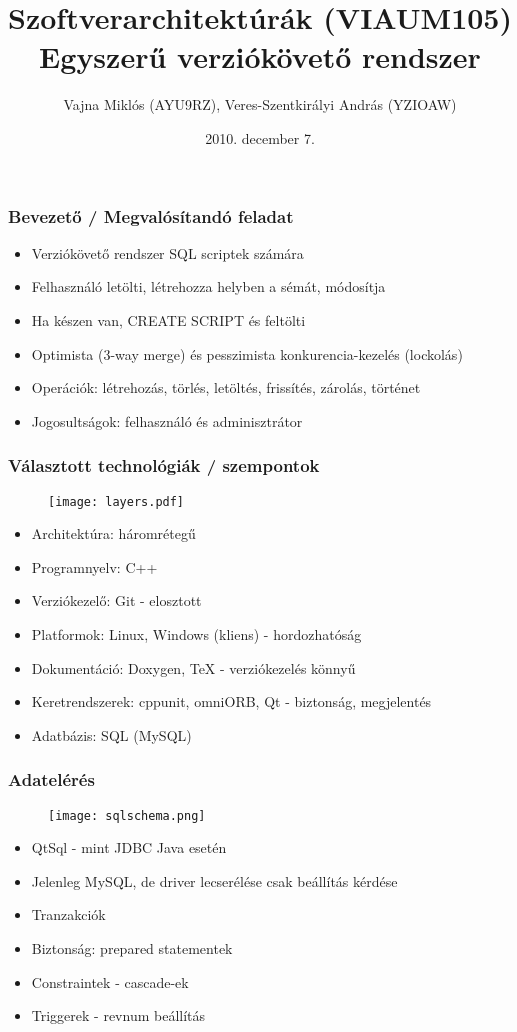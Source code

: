 \documentclass[hyperref={pdfpagelabels=false}]{beamer}
\author{Vajna Mikl\'os (AYU9RZ), Veres-Szentkir\'alyi Andr\'as (YZIOAW)}
\begin{document}
\title{Szoftverarchitektúrák (VIAUM105)\\Egyszerű verziókövető rendszer}
\date{2010. december 7.}

\frame{\titlepage}

\begin{frame}
\frametitle{Bevezető / Megvalósítandó feladat}
\begin{itemize}
\item Verziókövető rendszer SQL scriptek számára
\item Felhasználó letölti, létrehozza helyben a sémát, módosítja
\item Ha készen van, CREATE SCRIPT és feltölti
\item Optimista (3-way merge) és pesszimista konkurencia-kezelés (lockolás)
\item Operációk: létrehozás, törlés, letöltés, frissítés, zárolás, történet
\item Jogosultságok: felhasználó és adminisztrátor
\end{itemize}
\end{frame}

\begin{frame}
\frametitle{Választott technológiák / szempontok}
\begin{figure}[H]
\texttt{[image: layers.pdf]}
\end{figure}
\begin{itemize}
\item Architektúra: háromrétegű
\item Programnyelv: C++
\item Verziókezelő: Git - elosztott
\item Platformok: Linux, Windows (kliens) - hordozhatóság
\item Dokumentáció: Doxygen, \TeX{} - verziókezelés könnyű
\item Keretrendszerek: cppunit, omniORB, Qt - biztonság, megjelentés
\item Adatbázis: SQL (MySQL)
\end{itemize}
\end{frame}

\begin{frame}
\frametitle{Adatelérés}

\begin{figure}[H]
\texttt{[image: sqlschema.png]}
\end{figure}

\begin{itemize}
\item QtSql - mint JDBC Java esetén
\item Jelenleg MySQL, de driver lecserélése csak beállítás kérdése
\item Tranzakciók
\item Biztonság: prepared statementek
\item Constraintek - cascade-ek
\item Triggerek - revnum beállítás
\end{itemize}
\end{frame}
\end{document}
